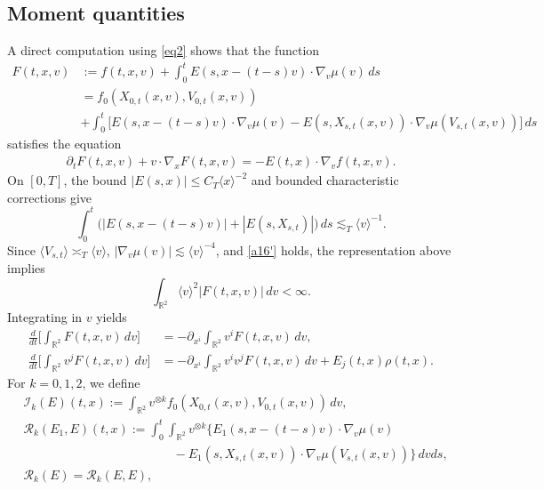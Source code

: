 \documentclass[reqno,11pt]{amsart}
\numberwithin{equation}{section}
\def\R{{\mathbb R}}
\def\R{{\bf R}}
\def\R{\mathbb{R}}
\begin{document}
	\subsection{Moment quantities}
	A direct computation using \eqref{eq2} shows that the function 
	\begin{equation*}
		\begin{split}
			F(t,x,v)&:=f(t,x,v)+\int_0^t E(s,x-(t-s)v)\cdot\nabla_v\mu(v)\, ds\\
			&=f_0(X_{0,t}(x,v),V_{0,t}(x,v))\\
			&+\int_0^t\big[E(s,x-(t-s)v)\cdot\nabla_v\mu(v)-E(s,X_{s,t}(x,v))\cdot\nabla_v\mu(V_{s,t}(x,v))\big]\, ds
		\end{split}
	\end{equation*}
	satisfies the equation
	\begin{equation*}
		\begin{split}
			\partial_{t}F(t,x,v)+v\cdot \nabla_xF(t,x,v)=-E(t,x)\cdot\nabla_v f(t,x,v).
		\end{split}
	\end{equation*}
	On $[0,T]$, the bound $|E(s,x)|\leq C_T\langle x\rangle^{-2}$
	and bounded characteristic corrections give
	\[
	\int_0^t\!\bigl(
	|E(s,x-(t-s)v)|+|E(s,X_{s,t})|
	\bigr)\,ds\lesssim_T\langle v\rangle^{-1}.
	\]
	Since $\langle V_{s,t}\rangle\asymp_T\langle v\rangle$,
	$|\nabla_v\mu(v)|\lesssim\langle v\rangle^{-4}$, and \eqref{a16'}
	holds, the representation above implies
	\[
	\int_{\mathbb R^2}\langle v\rangle^2|F(t,x,v)|\,dv<\infty.
	\]
	Integrating in $v$ yields
	\begin{equation}\label{z1}
		\begin{split}
			\frac{d}{dt}\Big[\int_{ \mathbb{R}^2}F(t,x,v)\,dv\Big]&=-\partial_{x^i}\int_{ \mathbb{R}^2}v^iF(t,x,v)\,dv,\\
			\frac{d}{dt}\Big[\int_{ \mathbb{R}^2}v^jF(t,x,v)\,dv\Big]&=-\partial_{x^i}\int_{ \mathbb{R}^2}v^iv^jF(t,x,v)\,dv+E_j(t,x)\rho(t,x). 
		\end{split}
	\end{equation}
	For $k=0,1,2$, we define
	\begin{equation}\label{z1.5}
		\begin{split}
			&\mathcal{I}_k(E)(t,x):=	\int_{\R^2} v^{\otimes k}f_0(X_{0,t}(x,v),V_{0,t}(x,v))\,dv,\\
			&\mathcal{R}_k(E_1,E)(t,x):=\int_{0}^{t}\int_{\R^2} v^{\otimes k}\big\{E_1(s,x-(t-s)v)\cdot\nabla_v\mu(v)\\
			&\qquad\qquad\qquad\qquad\qquad\qquad-E_1(s,X_{s,t}(x,v))\cdot\nabla_v\mu(V_{s,t}(x,v))\big\}\,dvds,\\
			&\mathcal{R}_k(E)=\mathcal{R}_k(E,E),
		\end{split}
	\end{equation}
\end{document}

